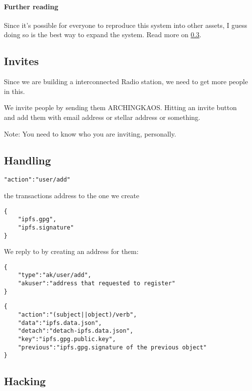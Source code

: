 \documentclass[10pt,a4paper,twocolumn]{paper}
\begin{document}
	\paragraph{Further reading}\label{further-reading}

Since it's possible for everyone to reproduce this system into other
assets, I guess doing so is the best way to expand the system. Read more
on \ref{hacking}.

	\subsection{Invites}\label{invites}

Since we are building a interconnected Radio station, we need to get
more people in this.

We invite people by sending them ARCHINGKAOS. Hitting an invite button
and add them with email address or stellar address or something.

Note: You need to know who you are inviting, personally.


	\subsection{Handling}\label{handling}


\begin{verbatim}
"action":"user/add"
\end{verbatim}

the transactions address to the one we create 
\begin{verbatim}
{
    "ipfs.gpg",
    "ipfs.signature"
}
\end{verbatim}

We reply to by creating an address for them:
\begin{verbatim}
{
    "type":"ak/user/add",
    "akuser":"address that requested to register"
}
\end{verbatim}

 \begin{verbatim} 	
{
    "action":"(subject||object)/verb",
    "data":"ipfs.data.json",
    "detach":"detach-ipfs.data.json",
    "key":"ipfs.gpg.public.key",
    "previous":"ipfs.gpg.signature of the previous object"
}
\end{verbatim}

	\subsection{Hacking}\label{hacking}
\end{document}
